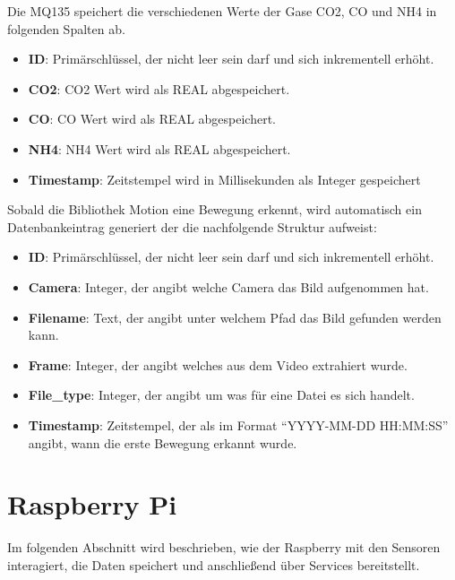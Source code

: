 Die MQ135 speichert die verschiedenen Werte der Gase CO2, CO und NH4 in folgenden Spalten ab.
\begin{itemize}
	\item \textbf{ID}: Primärschlüssel, der nicht leer sein darf und sich inkrementell erhöht.  
	\item \textbf{CO2}: CO2 Wert wird als REAL abgespeichert.
	\item \textbf{CO}: CO Wert wird als REAL abgespeichert.
	\item \textbf{NH4}: NH4 Wert wird als REAL abgespeichert. 
	\item \textbf{Timestamp}: Zeitstempel wird in Millisekunden als Integer gespeichert
\end{itemize}

Sobald die Bibliothek Motion eine Bewegung erkennt, wird automatisch ein Datenbankeintrag generiert der die nachfolgende Struktur aufweist:
\begin{itemize}
	\item \textbf{ID}: Primärschlüssel, der nicht leer sein darf und sich inkrementell erhöht.  
	\item \textbf{Camera}: Integer, der angibt welche Camera das Bild aufgenommen hat.
	\item \textbf{Filename}: Text, der angibt unter welchem Pfad das Bild gefunden werden kann.
	\item \textbf{Frame}: Integer, der angibt welches aus dem Video extrahiert wurde. 
	\item \textbf{File\_type}: Integer, der angibt um was für eine Datei es sich handelt.
	\item \textbf{Timestamp}: Zeitstempel, der als im Format \enquote{YYYY-MM-DD HH:MM:SS} angibt, wann die erste Bewegung erkannt wurde.	
\end{itemize}


\section{Raspberry Pi} 
Im folgenden Abschnitt wird beschrieben, wie der Raspberry mit den Sensoren interagiert, die Daten speichert und anschließend über Services bereitstellt.

